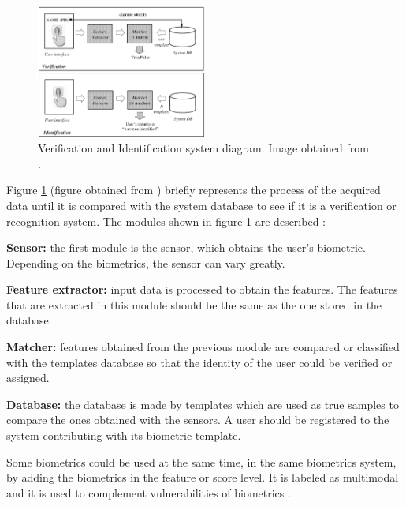 \begin{figure}[htb]
\centering
\includegraphics[width=0.5\textwidth]{images_miscelaneus/verif_identif.PNG}
\caption{Verification and Identification system diagram. Image obtained from \cite{Intro_biometrics2}.} \label{fig:Verif_ident}
\end{figure}

Figure \ref{fig:Verif_ident} (figure obtained from \cite{Intro_biometrics2}) briefly represents  the process of the acquired data until it is compared  with the system database to see if it is a verification or recognition system. The modules shown in figure \ref{fig:Verif_ident} are described \cite{Intro_biometrics2}:
\begin{description}[itemsep=2pt,topsep=8pt,parsep=0pt,partopsep=20pt]
\item \textbf{Sensor:} the first module is the sensor, which obtains the user's biometric. Depending on the biometrics, the sensor can vary greatly.
\item \textbf{Feature extractor:} input data is processed to obtain the features. The features that are extracted in this module should be the same as the one stored in the database.
\item \textbf{Matcher:} features obtained from the previous module are compared or classified with the templates database so that the identity of the user could be verified or assigned.
\item \textbf{Database:} the database is made by templates which are used as true samples to compare the ones obtained with the sensors. A user should be registered to the system contributing with its biometric template.
\end{description}

Some biometrics could be used at the same time, in the same biometrics system, by adding the biometrics in the feature or score level. It is labeled as multimodal and it is used to complement vulnerabilities of biometrics \cite{Spoofing_survey}.

